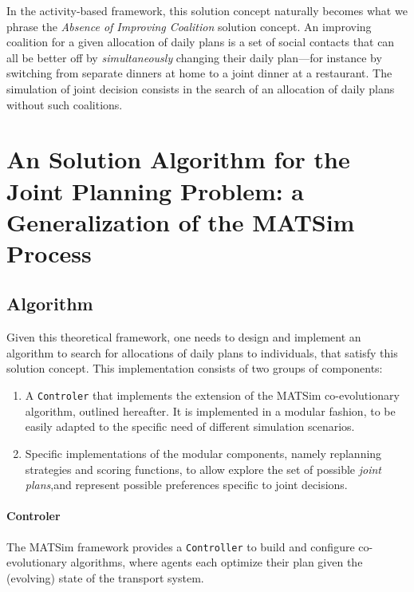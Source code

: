 {In the activity-based framework, this solution concept naturally becomes what we phrase the \emph{Absence of Improving Coalition} solution concept. An improving coalition for a given allocation of daily plans is a set of social contacts that can all be better off by \emph{simultaneously} changing their daily plan---for instance by switching from separate dinners at home to a joint dinner at a restaurant.
The simulation of joint decision consists in the search of an allocation of daily plans without such coalitions.

\section{An Solution Algorithm for the Joint Planning Problem: a Generalization of the MATSim Process}
\label{sec:td:algo}
\subsection{Algorithm}
Given this theoretical framework, one needs to design and implement an algorithm to search for allocations of daily plans to individuals, that satisfy this solution concept. This implementation consists of two groups of components:
%
\begin{enumerate}
\item A \lstinline|Controler| that implements the extension of the MATSim co-evolutionary algorithm, outlined hereafter. It is implemented in a modular fashion, to be easily adapted to the specific need of different simulation scenarios.
\item Specific implementations of the modular components, namely replanning strategies and scoring functions, to allow explore the set of possible \emph{joint plans},and represent possible preferences specific to joint decisions.
\end{enumerate}

\paragraph{Controler}

The MATSim framework provides a \lstinline|Controller| to build and configure co-evolutionary algorithms, where agents each optimize their plan given the (evolving) state of the transport system.

}
